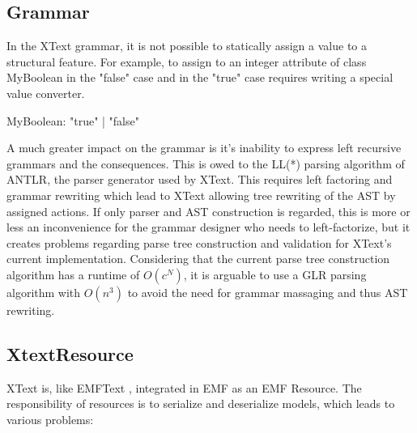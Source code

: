 \subsection{Grammar}
In the XText grammar, it is not possible to statically assign a value to a structural feature. For example, to assign  to an integer attribute  of class MyBoolean in the "false" case and  in the "true" case requires writing a special value converter. 
\begin{xtxt}
MyBoolean:  "true" | "false"
\end{xtxt}

A much greater impact on the grammar is it's inability to express left recursive grammars and the consequences. This is owed to the LL(*) parsing algorithm of ANTLR, the parser generator used by XText. This requires left factoring and grammar rewriting which lead to XText allowing tree rewriting of the AST by assigned actions. If only parser and AST construction is regarded, this is more or less an inconvenience for the grammar designer who needs to left-factorize, but it creates problems regarding parse tree construction and validation for XText's current implementation. Considering that the current parse tree construction algorithm has a runtime of $O(c^N)$, it is arguable to use a GLR parsing algorithm with $O(n^3)$ to avoid the need for grammar massaging and thus AST rewriting.

\subsection{XtextResource}
XText is, like EMFText \cite{EMFTextMan}, integrated in EMF as an EMF Resource. The responsibility of resources is to serialize and deserialize models, which leads to various problems: 

